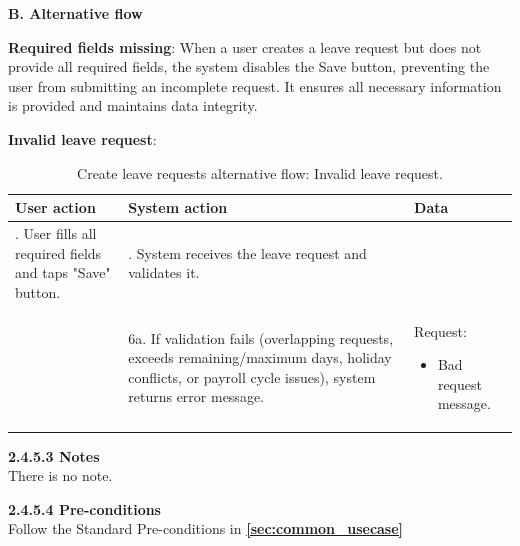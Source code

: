 \par\indent\indent\textbf{B. Alternative flow}
\vspace{0.3cm}
\par\indent\indent\indent\parbox{0.9\textwidth}{\textbf{Required fields missing}: When a user creates a leave request but does not provide all required fields, the system disables the Save button, preventing the user from submitting an incomplete request. It ensures all necessary information is provided and maintains data integrity.}
\vspace{0.05cm}
\par\indent\indent\indent\parbox{0.9\textwidth}{\textbf{Invalid leave request}:}
\vspace{-2em}
\renewcommand{\arraystretch}{1.5}
\begin{longtable}{|>{\raggedright\arraybackslash}p{4.5cm}|
                  >{\raggedright\arraybackslash}p{6cm}|
                  >{\raggedright\arraybackslash}p{4.5cm}|}                  
\caption{Create leave requests alternative flow: Invalid leave request.}
\label{tab:leave_request_management_invalid_alternative_flow} \\
\hline
\centering\textbf{User action} & \centering\textbf{System action} & \centering\arraybackslash\textbf{Data} \\
\hline
\endfirsthead
\endhead
5. User fills all required fields and taps "Save" button.& 6. System receives the leave request and validates it.&\\
\hline
& 6a. If validation fails (overlapping requests, exceeds remaining/maximum days, holiday conflicts, or payroll cycle issues), system returns error message.&
\par{Request: 
        \vspace{-0.8em}
        \begin{itemize}
            \item Bad request message.
        \end{itemize}
    }
\\
\hline
\end{longtable}

\indent\textbf{2.4.5.3 Notes}\\
\indent\indent There is no note.
\vspace{0.5em}

\indent\textbf{2.4.5.4 Pre-conditions}\\
\indent\indent Follow the Standard Pre-conditions in \textbf{\autoref{sec:common_usecase}}
\vspace{0.5em}

